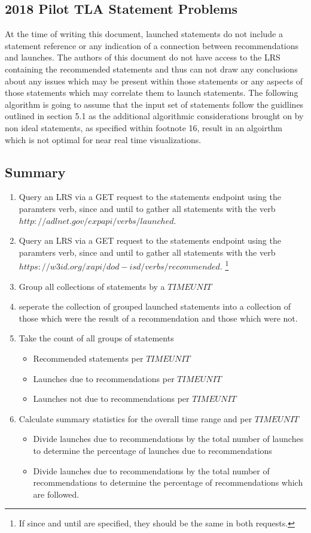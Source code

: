 \documentclass{article}
\begin{document}
\subsection{2018 Pilot TLA Statement Problems}
At the time of writing this document, launched statements do not
include a statement reference or any indication of a connection
between recommendations and launches. The authors of this document do
not have access to the LRS containing the recommended statements and
thus can not draw any conclusions about any issues which may be
present within those statements or any aspects of those statements
which may correlate them to launch statements. The following algorithm
is going to assume that the input set of statements follow the
guidlines outlined in section 5.1 as the additional algorithmic
considerations brought on by non ideal statements, as specified within
footnote 16, result in an algoirthm which is not optimal for near real
time visualizations.

\subsection{Summary}
\begin{enumerate}
  \item Query an LRS via a GET request to the statements endpoint
    using the paramters verb, since and until to gather all statements
    with the verb $http://adlnet.gov/expapi/verbs/launched$.
  \item Query an LRS via a GET request to the statements endpoint
    using the paramters verb, since and until to gather all statements
    with the verb $https://w3id.org/xapi/dod-isd/verbs/recommended$.
    \footnote{\label{sameSession} If since and until are specified,
      they should be the same in both requests.}
  \item Group all collections of statements by a $TIMEUNIT$
  \item seperate the collection of grouped launched statements into a
    collection of those which were the result of a recommendation and
    those which were not.
  \item Take the count of all groups of statements
    \begin{itemize}
    \item Recommended statements per $TIMEUNIT$
    \item Launches due to recommendations per $TIMEUNIT$
    \item Launches not due to recommendations per $TIMEUNIT$
    \end{itemize}
  \item Calculate summary statistics for the overall time range and
    per $TIMEUNIT$
    \begin{itemize}
    \item Divide launches due to recommendations by the total number of
      launches to determine the percentage of launches due to
      recommendations
    \item Divide launches due to recommendations by the total number
      of recommendations to determine the percentage of
      recommendations which are followed.
    \end{itemize}
\end{enumerate}
\end{document}
